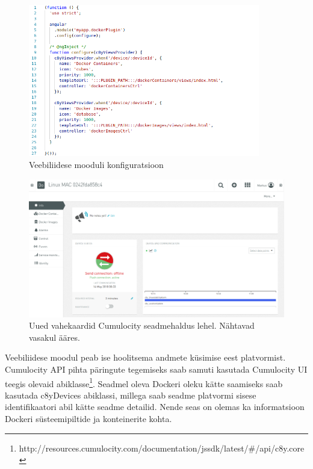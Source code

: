 \documentclass[12pt]{article}
\begin{document}
 \begin{figure} [ht] %
 \begin{center}
 \includegraphics[width=0.9\textwidth]{webplugin_config}
 \caption{Veebiliidese mooduli konfiguratsioon}
 \label{fig:webplugin_config}
 \end{center}
 \end{figure}
 
 \FloatBarrier

 \begin{figure} [ht] %
 \begin{center}
 \includegraphics[width=1\textwidth]{webplugin_new_tabs}
 \caption{Uued vahekaardid Cumulocity seadmehaldus lehel. Nähtavad vasakul ääres.}
 \label{fig:webplugin_new_tabs}
 \end{center}
 \end{figure}
 
 \FloatBarrier

 Veebiliidese moodul peab ise hoolitsema andmete küsimise eest platvormist. Cumulocity API pihta
 päringute tegemiseks saab samuti kasutada Cumulocity UI teegis olevaid
 abiklasse\footnote{http://resources.cumulocity.com/documentation/jssdk/latest/#/api/c8y.core}.
 Seadmel oleva Dockeri oleku kätte saamiseks saab kasutada c8yDevices abiklassi,
 millega saab seadme platvormi sisese identifikaatori abil kätte seadme detailid. Nende seas
 on olemas ka informatsioon Dockeri süsteemipiltide ja konteinerite kohta.
\end{document}
